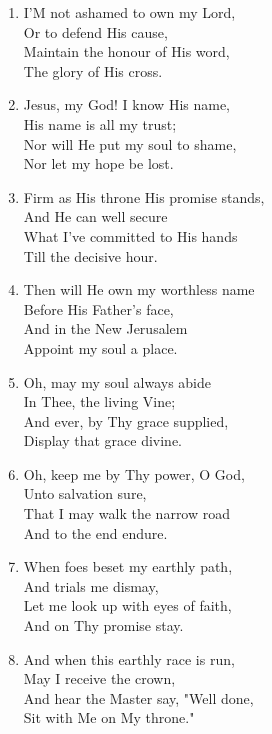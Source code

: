 \begin{enumerate}
    \item I'M not ashamed to own my Lord, \\
        Or to defend His cause, \\
        Maintain the honour of His word, \\
        The glory of His cross.

    \item Jesus, my God! I know His name, \\
        His name is all my trust; \\
        Nor will He put my soul to shame, \\
        Nor let my hope be lost.

    \item Firm as His throne His promise stands, \\
        And He can well secure \\
        What I've committed to His hands \\
        Till the decisive hour.

    \item Then will He own my worthless name \\
        Before His Father's face, \\
        And in the New Jerusalem \\
        Appoint my soul a place.

    \item Oh, may my soul always abide \\
        In Thee, the living Vine; \\
        And ever, by Thy grace supplied, \\
        Display that grace divine.

    \item Oh, keep me by Thy power, O God, \\
        Unto salvation sure, \\
        That I may walk the narrow road \\
        And to the end endure.

    \item When foes beset my earthly path, \\
        And trials me dismay, \\
        Let me look up with eyes of faith, \\
        And on Thy promise stay.

    \item And when this earthly race is run, \\
        May I receive the crown, \\
        And hear the Master say, "Well done, \\
        Sit with Me on My throne."

\end{enumerate}

